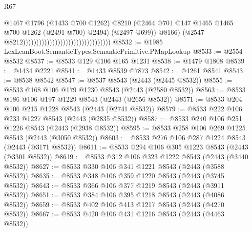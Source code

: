 \begin{lexlean}{R67}
\begin{coremodule}
                                                                        @1467
                                                                        @1796
                                                                        (@1433 @700 @1262)
                                                                        @8210
                                                                        (@2464
                                                                          @701
                                                                          @147
                                                                          @1465
                                                                          @1465
                                                                          @700
                                                                          @1262
                                                                          (@2491 @700)
                                                                          @2494)
                                                                        (@2497 @699))
                                                                      @8166)
                                                                    (@2547
                                                                      @8212)))))))))))))))))))))))))))))))))
@8532 := @1985 LexLeanBoot.SemanticTypes.SemanticPrimitive.PMapLookup
@8533 := @2554 @8532
@8537 := @8533 @129 @106 @165 @1231
@8538 := @1479 @1808
@8539 := @1434 @2221
@8541 := @1433 @8539 @7873
@8542 := @1261 @8541
@8543 := @8538 @8542
@8547 := @8537 @8543 (@2443 (@2445 @8532))
@8555 := @8533 @168 @106 @179 @1230 @8543 (@2443 (@2580 @8532))
@8563 := @8533 @186 @106 @197 @1229 @8543 (@2443 (@2656 @8532))
@8571 := @8533 @204 @106 @215 @1228 @8543 (@2443 (@2741 @8532))
@8579 := @8533 @222 @106 @233 @1227 @8543 (@2443 (@2835 @8532))
@8587 := @8533 @240 @106 @251 @1226 @8543 (@2443 (@2938 @8532))
@8595 := @8533 @258 @106 @269 @1225 @8543 (@2443 (@3050 @8532))
@8603 := @8533 @276 @106 @287 @1224 @8543 (@2443 (@3171 @8532))
@8611 := @8533 @294 @106 @305 @1223 @8543 (@2443 (@3301 @8532))
@8619 := @8533 @312 @106 @323 @1222 @8543 (@2443 (@3440 @8532))
@8627 := @8533 @330 @106 @341 @1221 @8543 (@2443 (@3588 @8532))
@8635 := @8533 @348 @106 @359 @1220 @8543 (@2443 (@3745 @8532))
@8643 := @8533 @366 @106 @377 @1219 @8543 (@2443 (@3911 @8532))
@8651 := @8533 @384 @106 @395 @1218 @8543 (@2443 (@4086 @8532))
@8659 := @8533 @402 @106 @413 @1217 @8543 (@2443 (@4270 @8532))
@8667 := @8533 @420 @106 @431 @1216 @8543 (@2443 (@4463 @8532))

\end{coremodule}
\end{lexlean}
